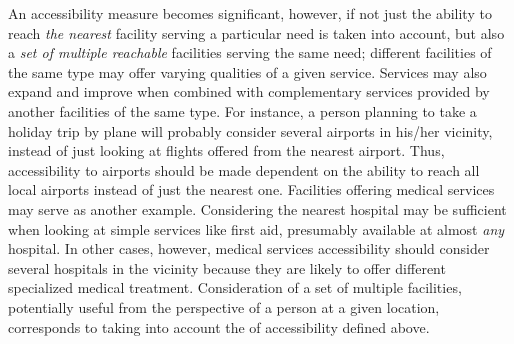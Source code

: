 An accessibility measure becomes significant, however, if not just the ability to reach \emph{the nearest} facility 
serving a particular need is taken into account, but also a \emph{set of multiple reachable} facilities serving the same 
need; different facilities of the same type may offer varying qualities of a given service. 
Services may also expand and improve when combined with complementary services provided by 
another facilities of the same type. For instance, a person planning to take a holiday trip by plane will probably 
consider several airports in his/her vicinity, instead of just looking at flights 
offered from the nearest airport. Thus, accessibility to airports should be made dependent on the ability 
to reach all local airports instead of just the nearest one. Facilities offering medical 
services may serve as another example. Considering the nearest hospital may be sufficient when looking 
at simple services like first aid, presumably available at almost \emph{any} hospital. In other cases, 
however, medical services accessibility should consider several hospitals in the vicinity 
because they are likely to offer different specialized medical treatment.
Consideration of a set of multiple facilities, potentially useful from the perspective of a person at
a given location, corresponds to 
taking into account the  of accessibility defined above.

